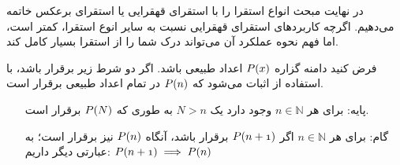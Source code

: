 

در نهایت مبحث انواع استقرا را با استقرای قهقرایی یا استقرای برعکس 
خاتمه می‌دهیم.
اگرچه کاربردهای استقرای قهقرایی نسبت به سایر انوع استقرا، کمتر است، اما فهم نحوه عملکرد آن
می‌تواند درک شما را از استقرا بسیار کامل کند.


\begin{DEFINITION}
    فرض کنید دامنه گزاره
    $\mathnormal{P(x)}$
    اعداد طبیعی باشد.
    اگر دو شرط زیر برقرار باشد، با استفاده از
    اثبات می‌شود که
    $\mathnormal{P(n)}$
    در تمام اعداد طبیعی برقرار است.
    
    \begin{enumerate}
        \item [پایه:]
                برای هر
                $n \in \mathbb{N}$
                وجود دارد یک
                $N > n$
                به طوری که
                $\mathnormal{P(N)}$
                برقرار است.

        \item[گام:]
            برای هر
            $n \in \mathbb{N}$
            اگر
            $\mathnormal{P(n + 1)}$
            برقرار باشد، آنگاه
            $\mathnormal{P(n)}$
            نیز برقرار است؛ به عبارتی دیگر داریم:
            $\mathnormal{P(n + 1)} \implies \mathnormal{P(n)}$


    \end{enumerate} 
    
\end{DEFINITION}

